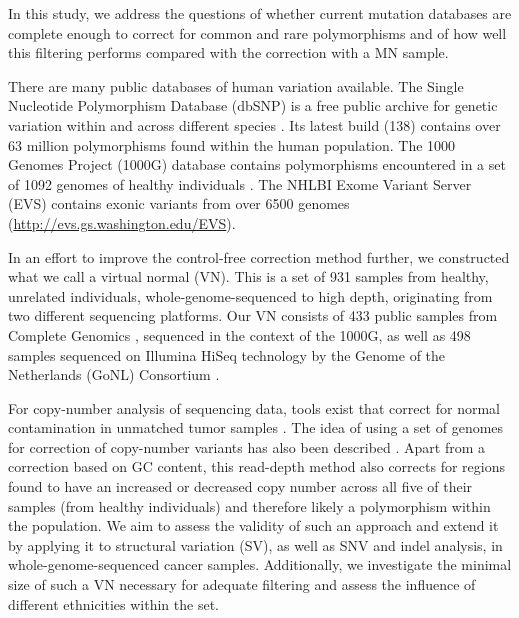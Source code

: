 In this study, we address the questions of whether current mutation databases are complete enough to correct for common and rare polymorphisms and of how well this filtering performs compared with the correction with a MN sample.

There are many public databases of human variation available. The Single Nucleotide Polymorphism Database (dbSNP) is a free public archive for genetic variation within and across different species \cite{sherry2001dbsnp}. Its latest build (138) contains over 63 million polymorphisms found within the human population. The 1000 Genomes Project (1000G) database contains polymorphisms encountered in a set of 1092 genomes of healthy individuals \cite{10002010map,10002012integrated}. The NHLBI Exome Variant Server (EVS) contains exonic variants from over 6500 genomes (\url{http://evs.gs.washington.edu/EVS}).

In an effort to improve the control-free correction method further, we constructed what we call a virtual normal (VN). This is a set of 931 samples from healthy, unrelated individuals, whole-genome-sequenced to high depth, originating from two different sequencing platforms. Our VN consists of 433 public samples from Complete Genomics \cite{drmanac2010human}, sequenced in the context of the 1000G, as well as 498 samples sequenced on Illumina HiSeq technology by the Genome of the Netherlands (GoNL) Consortium \cite{boomsma2014genome,francioli2014whole}.

For copy-number analysis of sequencing data, tools exist that correct for normal contamination in unmatched tumor samples \cite{boeva2010control}. The idea of using a set of genomes for correction of copy-number variants has also been described \cite{yoon2009sensitive}. Apart from a correction based on GC content, this read-depth method also corrects for regions found to have an increased or decreased copy number across all five of their samples (from healthy individuals) and therefore likely a polymorphism within the population. We aim to assess the validity of such an approach and extend it by applying it to structural variation (SV), as well as SNV and indel analysis, in whole-genome-sequenced cancer samples. Additionally, we investigate the minimal size of such a VN necessary for adequate filtering and assess the influence of different ethnicities within the set.


